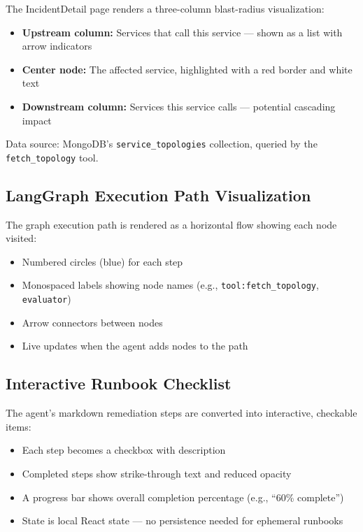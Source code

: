 \documentclass[11pt,a4paper]{article}
\begin{document}
The IncidentDetail page renders a three-column blast-radius visualization:

\begin{itemize}[leftmargin=*,itemsep=2pt]
  \item \textbf{Upstream column:} Services that call this service — shown as a list with arrow indicators
  \item \textbf{Center node:} The affected service, highlighted with a red border and white text
  \item \textbf{Downstream column:} Services this service calls — potential cascading impact
\end{itemize}

Data source: MongoDB's \texttt{service\_topologies} collection, queried by the \texttt{fetch\_topology} tool.

\subsection{LangGraph Execution Path Visualization}

The graph execution path is rendered as a horizontal flow showing each node visited:

\begin{itemize}[leftmargin=*,itemsep=2pt]
  \item Numbered circles (blue) for each step
  \item Monospaced labels showing node names (e.g., \texttt{tool:fetch\_topology}, \texttt{evaluator})
  \item Arrow connectors between nodes
  \item Live updates when the agent adds nodes to the path
\end{itemize}

\subsection{Interactive Runbook Checklist}

The agent's markdown remediation steps are converted into interactive, checkable items:

\begin{itemize}[leftmargin=*,itemsep=2pt]
  \item Each step becomes a checkbox with description
  \item Completed steps show strike-through text and reduced opacity
  \item A progress bar shows overall completion percentage (e.g., ``60\% complete'')
  \item State is local React state — no persistence needed for ephemeral runbooks
\end{itemize}
\end{document}
